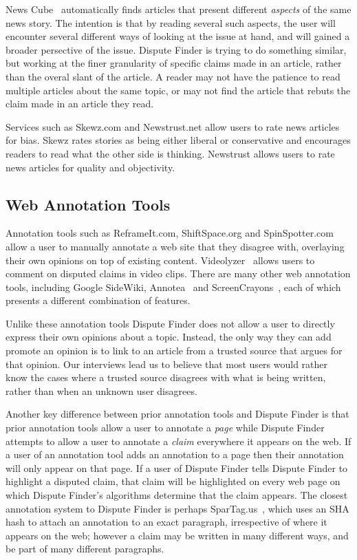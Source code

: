 \documentclass{www2010-submission}
\begin{document}
News Cube~\cite{Park2009} automatically finds articles that present different {\it aspects} of the same news story. The intention is that by reading several such aspects, the user will encounter several different ways of looking at the issue at hand, and will gained a broader persective of the issue. Dispute Finder is trying to do something similar, but working at the finer granularity of specific claims made in an article, rather than the overal slant of the article. A reader may not have the patience to read multiple articles about the same topic, or may not find the article that rebuts the claim made in an article they read. 

Services such as Skewz.com and Newstrust.net allow users to rate news articles for bias. Skewz rates stories as being either liberal or conservative and encourages readers to read what the other side is thinking. Newstrust allows users to rate news articles for quality and objectivity. 


\subsection{Web Annotation Tools}

Annotation tools such as ReframeIt.com, ShiftSpace.org and SpinSpotter.com allow a user to manually annotate a web site that they disagree with, overlaying their own opinions on top of existing content. Videolyzer~\cite{Diakopoulos2008} allows users to comment on disputed claims in video clips. There are many other web annotation tools, including Google SideWiki, Annotea~\cite{Koivunen2001} and ScreenCrayons~\cite{Olsen2004}, each of which presents a different combination of features.

Unlike these annotation tools Dispute Finder does not allow a user to directly express their own opinions about a topic. Instead, the only way they can add promote an opinion is to link to an article from a trusted source that argues for that opinion. Our interviews lead us to believe that most users would rather know the cases where a trusted source disagrees with what is being written, rather than when an unknown user disagrees.

Another key difference between prior annotation tools and Dispute Finder is that prior annotation tools allow a user to annotate a {\it page} while Dispute Finder attempts to allow a user to annotate a {\it claim} everywhere it appears on the web. If a user of an annotation tool adds an annotation to a page then their annotation will only appear on that page. If a user of Dispute Finder tells Dispute Finder to highlight a disputed claim, that claim will be highlighted on every web page on which Dispute Finder's algorithms determine that the claim appears. The closest annotation system to Dispute Finder is perhaps SparTag.us~\cite{Hong2009}, which uses an SHA hash to attach an annotation to an exact paragraph, irrespective of where it appears on the web; however a claim may be written in many different ways, and be part of many different paragraphs.
\end{document}
